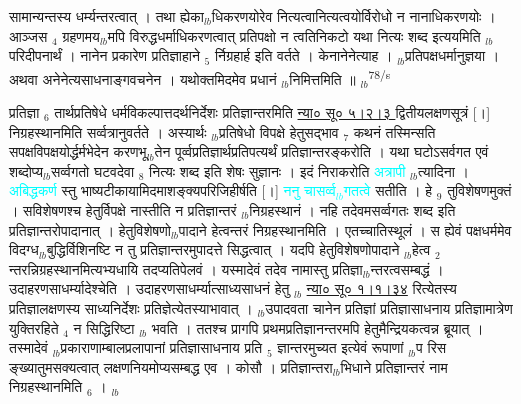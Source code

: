 \documentclass[article,12pt,a4paper]{memoir}%
\newcommand{\quotelemma}[1]{\textcolor{cyan}{#1}}
\newcounter{parCount}
\begin{document}
सामान्यन्तस्य धर्म्यन्तरत्वात् । तथा ह्येका{\tiny $_{lb}$}धिकरणयोरेव नित्यत्वानित्यत्वयोर्विरोधो न नानाधिकरणयोः । आञ्जस {\tiny $_{4}$} ग्रहणमय{\tiny $_{lb}$}मपि विरुद्धधर्माधिकरणत्वात् प्रतिपक्षो न त्वतिनिकटो यथा नित्यः शब्द इत्ययमिति {\tiny $_{lb}$}परिदीपनार्थं । नानेन प्रकारेण प्रतिज्ञाहाने {\tiny $_{5}$} र्निग्रहार्ह इति वर्तते । केनानेनेत्याह । {\tiny $_{lb}$}प्रतिपक्षधर्मानुज्ञया । अथवा अनेनेत्यसाधनाङ्गवचनेन । यथोक्तमिदमेव प्रधानं {\tiny $_{lb}$}निमित्तमिति ॥
	{}
	\pend%
      {\tiny $_{lb}$}\textsuperscript{\textenglish{78/s}}

	  
	  \pstart \leavevmode%
	\hphantom{.}प्रतिज्ञा {\tiny $_{6}$} तार्थप्रतिषेधे धर्मविकल्पात्तदर्थनिर्देशः प्रतिज्ञान्तरमिति \cite[9a5]{vn-msN} \href{http://sarit.indology.info/?cref=ns\%C5\%AB.5.2.3}{न्या० सू० ५।२।३ } द्वितीयलक्षणसूत्रं [।] निग्रहस्थानमिति सर्व्वत्रानुवर्तते । अस्यार्थः {\tiny $_{lb}$}प्रतिषेधो विपक्षे हेतुसद्भाव {\tiny $_{7}$} कथनं तस्मिन्सति सपक्षविपक्षयोर्द्धर्मभेदेन करणभू{\tiny $_{lb}$}तेन पूर्व्वप्रतिज्ञार्थप्रतिपत्यर्थं प्रतिज्ञान्तरङ्करोति । यथा घटोऽसर्वगत एवं शब्दोप्य{\tiny $_{lb}$}सर्व्वगतो घटवदेवा {\tiny $_{8}$} नित्यः शब्द इति शेषः सुज्ञानः । इदं निराकरोति \quotelemma{अत्रापी} \cite[9a8]{vn-msN} {\tiny $_{lb}$}त्यादिना । \quotelemma{अबिद्धकर्ण} स्तु भाष्यटीकायामिदमाशङ्क्यपरिजिहीर्षति [।] \quotelemma{ननु चासर्व्व{\tiny $_{lb}$}गतत्वे} सतीति । हे {\tiny $_{9}$} \leavevmode{} तुविशेषणमुक्तं । सविशेषणश्च हेतुर्विपक्षे नास्तीति न प्रतिज्ञान्तरं {\tiny $_{lb}$}निग्रहस्थानं । नहि तदेवमसर्व्वगतः शब्द इति प्रतिज्ञान्तरोपादानात् । हेतुविशेषणो{\tiny $_{lb}$}पादाने हेत्वन्तरं निग्रहस्थानमिति । एतच्चातिस्थूलं । स ह्येवं पक्षधर्ममेव विदग्ध{\tiny $_{lb}$}बुद्धिर्विशिनष्टि न तु प्रतिज्ञान्तरमुपादत्ते सिद्धत्वात् । यदपि हेतुविशेषणोपादाने {\tiny $_{lb}$}हेत्व {\tiny $_{2}$} न्तरन्निग्रहस्थानमित्यभ्यधायि तदप्यतिपेलवं । यस्मादेवं तदेव नामास्तु प्रतिज्ञा{\tiny $_{lb}$}न्तरत्वसम्बद्धं । उदाहरणसाधर्म्यादेश्चेति । उदाहरणसाधर्म्यात्साध्यसाधनं हेतु {\tiny $_{lb}$} \href{http://sarit.indology.info/?cref=ns\%C5\%AB.1.1.34}{न्या० सू० १।१।३४} रित्येतस्य प्रतिज्ञालक्षणस्य साध्यनिर्देशः प्रतिज्ञेत्येतस्याभावात् । {\tiny $_{lb}$}उपादवता चानेन प्रतिज्ञां प्रतिज्ञासाधनाय प्रतिज्ञामात्रेण युक्तिरहिते {\tiny $_{4}$} न सिद्धिरिष्टा {\tiny $_{lb}$} \leavevmode{} भवति । ततश्च प्रागपि प्रथमप्रतिज्ञानन्तरमपि हेतुमैन्द्रियकत्वन्न ब्रूयात् । तस्मादेवं {\tiny $_{lb}$}प्रकाराणाम्बालप्रलापानां प्रतिज्ञासाधनाय प्रति {\tiny $_{5}$} ज्ञान्तरमुच्यत इत्येवं रूपाणां {\tiny $_{lb}$}प रिस ङ्ख्यातुमसक्यत्वात् लक्षणनियमोप्यसम्बद्ध एव । कोसौ । प्रतिज्ञान्तरा{\tiny $_{lb}$}भिधाने प्रतिज्ञान्तरं नाम निग्रहस्थानमिति {\tiny $_{6}$} ।
	{}
	\pend%
      {\tiny $_{lb}$}
\end{document}
